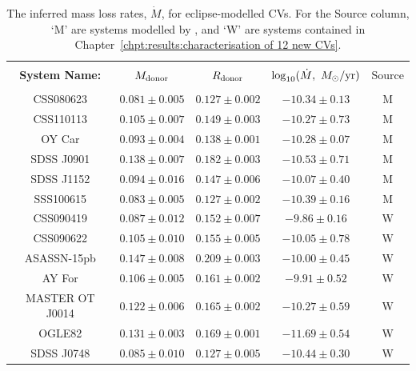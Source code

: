 \begin{table}
    \centering
    \caption{The inferred mass loss rates, $\dot M$, for eclipse-modelled CVs. For the Source column, `M' are systems modelled by \citet{McAllister2019}, and `W' are systems contained in Chapter~\ref{chpt:results:characterisation of 12 new CVs}.}
    \label{table:results:mdot modelling}
    \begin{tabular}{ccccc}
        \hline \\
        {\bf System Name:}  & \textbf{$M_{\rm donor}$}  & \textbf{$R_{\rm donor}$}  & \textbf{$\log_{10}(\dot M,\ M_\odot / {\rm yr})$} & Source\\
        \hline \hline \\
        CSS080623       & $0.081\pm0.005$  & $0.127\pm0.002$   & $ -10.34 \pm 0.13$   & M \\
        CSS110113       & $0.105\pm0.007$  & $0.149\pm0.003$   & $ -10.27 \pm 0.73$   & M \\
        OY Car          & $0.093\pm0.004$  & $0.138\pm0.001$   & $ -10.28 \pm 0.07$   & M \\
        SDSS J0901      & $0.138\pm0.007$  & $0.182\pm0.003$   & $ -10.53 \pm 0.71$   & M \\
        SDSS J1152      & $0.094\pm0.016$  & $0.147\pm0.006$   & $ -10.07 \pm 0.40$   & M \\
        SSS100615       & $0.083\pm0.005$  & $0.127\pm0.002$   & $ -10.39 \pm 0.16$   & M \\
        CSS090419       & $0.087\pm0.012$  & $0.152\pm0.007$   & $  -9.86 \pm 0.16$   & W \\
        CSS090622       & $0.105\pm0.010$  & $0.155\pm0.005$   & $ -10.05 \pm 0.78$   & W \\
        ASASSN-15pb     & $0.147\pm0.008$  & $0.209\pm0.003$   & $ -10.00 \pm 0.45$   & W \\
        AY For          & $0.106\pm0.005$  & $0.161\pm0.002$   & $  -9.91 \pm 0.52$   & W \\
        MASTER OT J0014 & $0.122\pm0.006$  & $0.165\pm0.002$   & $ -10.27 \pm 0.59$   & W \\
        OGLE82          & $0.131\pm0.003$  & $0.169\pm0.001$   & $ -11.69 \pm 0.54$   & W \\
        SDSS J0748      & $0.085\pm0.010$  & $0.127\pm0.005$   & $ -10.44 \pm 0.30$   & W \\

\end{tabular}
\end{table}
